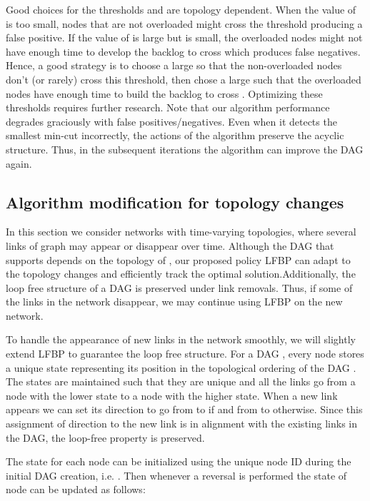 \documentclass{sig-alternate-2013}
\begin{document}
Good choices for the thresholds  and  are topology dependent. When the value of  is too small, nodes that are not overloaded might cross the threshold producing a false positive. If the value of  is large but  is small, the overloaded nodes might not have enough time to develop the backlog to cross  which produces false negatives. Hence, a good strategy is to choose a large  so that the non-overloaded nodes don't (or rarely) cross this threshold, then chose a large  such that the overloaded nodes have enough time to build the backlog to cross . Optimizing these thresholds requires further research. Note that our algorithm performance degrades graciously with false positives/negatives. Even when it detects the smallest min-cut incorrectly, the actions of the algorithm preserve the acyclic structure. Thus, in the subsequent iterations the algorithm can improve the DAG again. 




\subsection{Algorithm modification for topology changes}
In this section we consider networks with time-varying topologies, where several links of graph  may appear or disappear over time. Although the DAG that supports  depends on the topology of , our proposed policy LFBP can adapt to the topology changes and efficiently track the optimal solution.Additionally, the loop free structure of a DAG is preserved under link removals. Thus, if some of the links in the network disappear, we may continue using LFBP on the new network. 

To handle the appearance of new links in the network smoothly, we will slightly extend LFBP to guarantee the  loop free structure.
 For a DAG , every node  stores a unique state  representing its position in the topological ordering of the DAG . The states are maintained such that they are unique and all the links go from a node with the lower state to a node with the higher state. When a new link  appears we can set its direction to go from  to  if  and from  to  otherwise. Since this assignment of direction to the new link is in alignment with the existing links in the DAG, the loop-free property is preserved.

The state for each node  can be initialized using the unique node ID during the initial DAG creation, i.e. . Then whenever a reversal is performed the state of node  can be updated as follows: 
\end{document}
